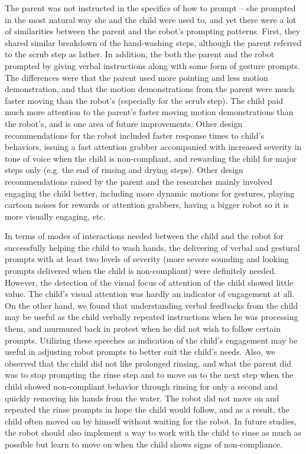 The parent was not instructed in the specifics of how to prompt -- she prompted in the most natural way she and the child were used to, and yet there were a lot of similarities between the parent and the robot's prompting patterns.  First, they shared similar breakdown of the hand-washing steps, although the parent referred to the scrub step as lather.  In addition, the both the parent and the robot prompted by giving verbal instructions along with some form of gesture prompts.  The differences were that the parent used more pointing and less motion demonstration, and that the motion demonstrations from the parent were much faster moving than the robot's (especially for the scrub step).  The child paid much more attention to the parent's faster moving motion demonstrations than the robot's, and is one area of future improvements.  Other design recommendations for the robot included faster response times to child's behaviors, issuing a fast attention grabber accompanied with increased severity in tone of voice when the child is non-compliant, and rewarding the child for major steps only (e.g. the end of rinsing and drying steps).  Other design recommendations raised by the parent and the researcher mainly involved engaging the child better, including more dynamic motions for gestures, playing cartoon noises for rewards or attention grabbers, having a bigger robot so it is more visually engaging, etc.

In terms of modes of interactions needed between the child and the robot for successfully helping the child to wash hands, the delivering of verbal and gestural prompts with at least two levels of severity (more severe sounding and looking prompts delivered when the child is non-compliant) were definitely needed.  However, the detection of the visual focus of attention of the child showed little value.  The child's visual attention was hardly an indicator of engagement at all.  On the other hand, we found that understanding verbal feedbacks from the child may be useful as the child verbally repeated instructions when he was processing them, and murmured back in protest when he did not wish to follow certain prompts.  Utilizing these speeches as indication of the child's engagement may be useful in adjusting robot prompts to better suit the child's needs.  Also, we observed that the child did not like prolonged rinsing, and what the parent did was to stop prompting the rinse step and to move on to the next step when the child showed non-compliant behavior through rinsing for only a second and quickly removing his hands from the water.  The robot did not move on and repeated the rinse prompts in hope the child would follow, and as a result, the child often moved on by himself without waiting for the robot.  In future studies, the robot should also implement a way to work with the child to rinse as much as possible but learn to move on when the child shows signs of non-compliance.


